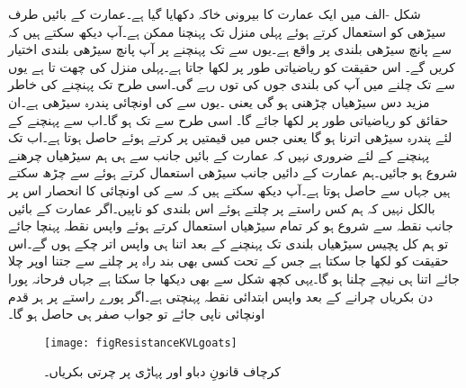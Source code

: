شکل -الف میں ایک عمارت کا بیرونی خاکہ دکھایا گیا ہے۔عمارت کے بائیں طرف سیڑھی کو استعمال کرتے ہوئے پہلی منزل  تک پہنچنا ممکن ہے۔آپ دیکھ سکتے ہیں کہ  سے پانچ سیڑھی بلندی پر  واقع ہے۔یوں  سے   تک پہنچنے پر  آپ پانچ سیڑھی بلندی اختیار کریں گے۔ اس حقیقت کو ریاضیاتی طور پر  لکھا جاتا ہے۔پہلی منزل کی چھت  تا  ہے یوں  سے  تک چلنے میں آپ کی بلندی جوں کی توں رہے گی۔اسی طرح  تک پہنچنے کی خاطر مزید دس سیڑھیاں چڑھنی ہو گی یعنی ۔یوں  سے  کی اونچائی پندرہ سیڑھی ہے۔ان حقائق کو ریاضیاتی طور پر  لکھا جائے گا۔ اسی طرح  سے  تک  ہو گا۔اب  سے  پہنچنے کے لئے پندرہ سیڑھی اترنا ہو گا یعنی  جس میں قیمتیں پر کرتے ہوئے  حاصل ہوتا ہے۔اب  تک  پہنچنے کے لئے ضروری نہیں کہ عمارت کے بائیں جانب سے ہی ہم سیڑھیاں چرھنے شروع ہو جائیں۔ہم عمارت کے دائیں جانب سیڑھی استعمال کرتے ہوئے  سے  چڑھ سکتے ہیں جہاں سے  حاصل ہوتا ہے۔آپ دیکھ سکتے ہیں کہ  سے  کی اونچائی کا انحصار اس پر بالکل نہیں کہ ہم کس راستے پر چلتے ہوئے اس بلندی کو ناپیں۔اگر عمارت کے بائیں جانب نقطہ  سے شروع ہو کر تمام سیڑھیاں استعمال کرتے ہوئے واپس  نقطہ  پہنچا جائے تو ہم کل پچیس سیڑھیاں بلندی تک پہنچنے کے بعد اتنا ہی واپس اتر چکے ہوں گے۔اس حقیقت کو  لکھا جا سکتا ہے جس کے تحت کسی بھی بند راہ پر چلنے سے جتنا اوپر چلا جائے اتنا ہی نیچے چلنا ہو گا۔یہی کچھ شکل  سے بھی دیکھا جا سکتا ہے جہاں فرحانہ پورا دن بکریاں چرانے کے بعد واپس ابتدائی نقطہ  پہنچتی ہے۔اگر پورے راستے پر ہر قدم اونچائی ناپی جائے تو جواب صفر ہی حاصل ہو گا۔ 

\begin{figure}
\centering
\texttt{[image: figResistanceKVLgoats]}
\caption{کرچاف قانونِ دباو اور پہاڑی پر چرتی بکریاں۔}
\label{شکل_مزاحمتی_قانون_دباو_بکریاں}
\end{figure}
 
